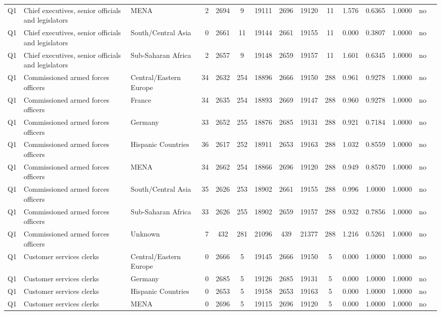\begin{longtable}{lllrcccccccccll}
Q1 & Chief executives, senior officials and legislators & MENA & 2 & 2694 & 9 & 19111 & 2696 & 19120 & 11 & 1.576 & 0.6365 & 1.0000 & no \\
Q1 & Chief executives, senior officials and legislators & South/Central Asia & 0 & 2661 & 11 & 19144 & 2661 & 19155 & 11 & 0.000 & 0.3807 & 1.0000 & no \\
Q1 & Chief executives, senior officials and legislators & Sub-Saharan Africa & 2 & 2657 & 9 & 19148 & 2659 & 19157 & 11 & 1.601 & 0.6345 & 1.0000 & no \\
Q1 & Commissioned armed forces officers & Central/Eastern Europe & 34 & 2632 & 254 & 18896 & 2666 & 19150 & 288 & 0.961 & 0.9278 & 1.0000 & no \\
Q1 & Commissioned armed forces officers & France & 34 & 2635 & 254 & 18893 & 2669 & 19147 & 288 & 0.960 & 0.9278 & 1.0000 & no \\
Q1 & Commissioned armed forces officers & Germany & 33 & 2652 & 255 & 18876 & 2685 & 19131 & 288 & 0.921 & 0.7184 & 1.0000 & no \\
Q1 & Commissioned armed forces officers & Hispanic Countries & 36 & 2617 & 252 & 18911 & 2653 & 19163 & 288 & 1.032 & 0.8559 & 1.0000 & no \\
Q1 & Commissioned armed forces officers & MENA & 34 & 2662 & 254 & 18866 & 2696 & 19120 & 288 & 0.949 & 0.8570 & 1.0000 & no \\
Q1 & Commissioned armed forces officers & South/Central Asia & 35 & 2626 & 253 & 18902 & 2661 & 19155 & 288 & 0.996 & 1.0000 & 1.0000 & no \\
Q1 & Commissioned armed forces officers & Sub-Saharan Africa & 33 & 2626 & 255 & 18902 & 2659 & 19157 & 288 & 0.932 & 0.7856 & 1.0000 & no \\
Q1 & Commissioned armed forces officers & Unknown & 7 & 432 & 281 & 21096 & 439 & 21377 & 288 & 1.216 & 0.5261 & 1.0000 & no \\
Q1 & Customer services clerks & Central/Eastern Europe & 0 & 2666 & 5 & 19145 & 2666 & 19150 & 5 & 0.000 & 1.0000 & 1.0000 & no \\
Q1 & Customer services clerks & Germany & 0 & 2685 & 5 & 19126 & 2685 & 19131 & 5 & 0.000 & 1.0000 & 1.0000 & no \\
Q1 & Customer services clerks & Hispanic Countries & 0 & 2653 & 5 & 19158 & 2653 & 19163 & 5 & 0.000 & 1.0000 & 1.0000 & no \\
Q1 & Customer services clerks & MENA & 0 & 2696 & 5 & 19115 & 2696 & 19120 & 5 & 0.000 & 1.0000 & 1.0000 & no \\

\end{longtable}

